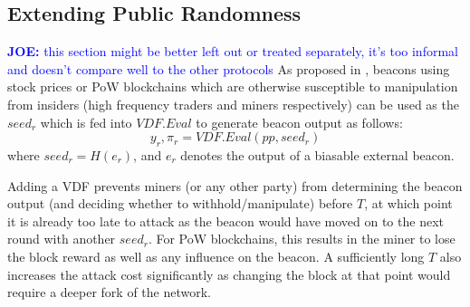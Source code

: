 \documentclass[letterpaper,twocolumn,10pt]{article}
\theoremstyle{definition}
\theoremstyle{remark}
\newcommand{\joenote}[1]{\textcolor{blue}{\textbf{JOE:} #1}}
\begin{document}
\subsection{Extending Public Randomness}
\joenote{this section might be better left out or treated separately, it's too informal and doesn't compare well to the other protocols}
As proposed in \cite{bunz2017proofs, bonneau2015bitcoin}, beacons using stock prices \cite{clark2010use} or PoW blockchains \cite{bonneau2015bitcoin} which are otherwise susceptible to manipulation from insiders (high frequency traders and miners respectively) can be used as the $seed_r$ which is fed into $VDF.Eval$ to generate beacon output as follows:
$$y_r, \pi_r = VDF.Eval(pp, seed_r)$$
where $seed_r = H(e_r)$, and $e_r$ denotes the output of a biasable external beacon.

Adding a VDF prevents miners (or any other party) from determining the beacon output (and deciding whether to withhold/manipulate) before $T$, at which point it is already too late to attack as the beacon would have moved on to the next round with another $seed_r$. For PoW blockchains, this results in the miner to lose the block reward as well as any influence on the beacon. A sufficiently long $T$ also increases the attack cost significantly as changing the block at that point would require a deeper fork of the network. 
\end{document}
